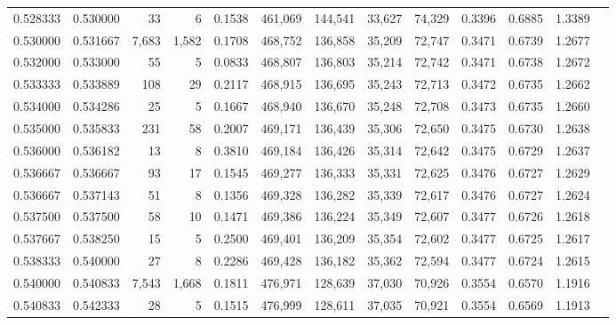 \begin{tabular}{rrrrrrrrrrrrr}
0.528333 & 0.530000 &     33 &     6 &                                     0.1538 & 461,069 & 144,541 &  33,627 &  74,329 & 0.3396 & 0.6885 & 1.3389 \\
0.530000 & 0.531667 &  7,683 & 1,582 &                                     0.1708 & 468,752 & 136,858 &  35,209 &  72,747 & 0.3471 & 0.6739 & 1.2677 \\
0.532000 & 0.533000 &     55 &     5 &                                     0.0833 & 468,807 & 136,803 &  35,214 &  72,742 & 0.3471 & 0.6738 & 1.2672 \\
0.533333 & 0.533889 &    108 &    29 &                                     0.2117 & 468,915 & 136,695 &  35,243 &  72,713 & 0.3472 & 0.6735 & 1.2662 \\
0.534000 & 0.534286 &     25 &     5 &                                     0.1667 & 468,940 & 136,670 &  35,248 &  72,708 & 0.3473 & 0.6735 & 1.2660 \\
0.535000 & 0.535833 &    231 &    58 &                                     0.2007 & 469,171 & 136,439 &  35,306 &  72,650 & 0.3475 & 0.6730 & 1.2638 \\
0.536000 & 0.536182 &     13 &     8 &                                     0.3810 & 469,184 & 136,426 &  35,314 &  72,642 & 0.3475 & 0.6729 & 1.2637 \\
0.536667 & 0.536667 &     93 &    17 &                                     0.1545 & 469,277 & 136,333 &  35,331 &  72,625 & 0.3476 & 0.6727 & 1.2629 \\
0.536667 & 0.537143 &     51 &     8 &                                     0.1356 & 469,328 & 136,282 &  35,339 &  72,617 & 0.3476 & 0.6727 & 1.2624 \\
0.537500 & 0.537500 &     58 &    10 &                                     0.1471 & 469,386 & 136,224 &  35,349 &  72,607 & 0.3477 & 0.6726 & 1.2618 \\
0.537667 & 0.538250 &     15 &     5 &                                     0.2500 & 469,401 & 136,209 &  35,354 &  72,602 & 0.3477 & 0.6725 & 1.2617 \\
0.538333 & 0.540000 &     27 &     8 &                                     0.2286 & 469,428 & 136,182 &  35,362 &  72,594 & 0.3477 & 0.6724 & 1.2615 \\
0.540000 & 0.540833 &  7,543 & 1,668 &                                     0.1811 & 476,971 & 128,639 &  37,030 &  70,926 & 0.3554 & 0.6570 & 1.1916 \\
0.540833 & 0.542333 &     28 &     5 &                                     0.1515 & 476,999 & 128,611 &  37,035 &  70,921 & 0.3554 & 0.6569 & 1.1913 \\

\end{tabular}
